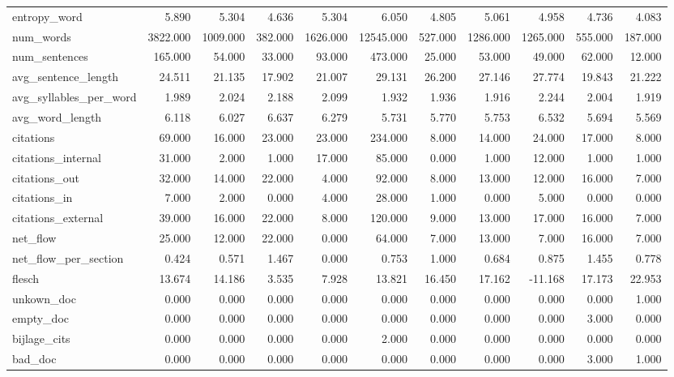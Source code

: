 \begin{tabular}{lrrrrrrrrrr}
\cline{1-11}
entropy\_word & 5.890 & 5.304 & 4.636 & 5.304 & 6.050 & 4.805 & 5.061 & 4.958 & 4.736 & 4.083 \\
\cline{1-11}
num\_words & 3822.000 & 1009.000 & 382.000 & 1626.000 & 12545.000 & 527.000 & 1286.000 & 1265.000 & 555.000 & 187.000 \\
\cline{1-11}
num\_sentences & 165.000 & 54.000 & 33.000 & 93.000 & 473.000 & 25.000 & 53.000 & 49.000 & 62.000 & 12.000 \\
\cline{1-11}
avg\_sentence\_length & 24.511 & 21.135 & 17.902 & 21.007 & 29.131 & 26.200 & 27.146 & 27.774 & 19.843 & 21.222 \\
\cline{1-11}
avg\_syllables\_per\_word & 1.989 & 2.024 & 2.188 & 2.099 & 1.932 & 1.936 & 1.916 & 2.244 & 2.004 & 1.919 \\
\cline{1-11}
avg\_word\_length & 6.118 & 6.027 & 6.637 & 6.279 & 5.731 & 5.770 & 5.753 & 6.532 & 5.694 & 5.569 \\
\cline{1-11}
citations & 69.000 & 16.000 & 23.000 & 23.000 & 234.000 & 8.000 & 14.000 & 24.000 & 17.000 & 8.000 \\
\cline{1-11}
citations\_internal & 31.000 & 2.000 & 1.000 & 17.000 & 85.000 & 0.000 & 1.000 & 12.000 & 1.000 & 1.000 \\
\cline{1-11}
citations\_out & 32.000 & 14.000 & 22.000 & 4.000 & 92.000 & 8.000 & 13.000 & 12.000 & 16.000 & 7.000 \\
\cline{1-11}
citations\_in & 7.000 & 2.000 & 0.000 & 4.000 & 28.000 & 1.000 & 0.000 & 5.000 & 0.000 & 0.000 \\
\cline{1-11}
citations\_external & 39.000 & 16.000 & 22.000 & 8.000 & 120.000 & 9.000 & 13.000 & 17.000 & 16.000 & 7.000 \\
\cline{1-11}
net\_flow & 25.000 & 12.000 & 22.000 & 0.000 & 64.000 & 7.000 & 13.000 & 7.000 & 16.000 & 7.000 \\
\cline{1-11}
net\_flow\_per\_section & 0.424 & 0.571 & 1.467 & 0.000 & 0.753 & 1.000 & 0.684 & 0.875 & 1.455 & 0.778 \\
\cline{1-11}
flesch & 13.674 & 14.186 & 3.535 & 7.928 & 13.821 & 16.450 & 17.162 & -11.168 & 17.173 & 22.953 \\
\cline{1-11}
unkown\_doc & 0.000 & 0.000 & 0.000 & 0.000 & 0.000 & 0.000 & 0.000 & 0.000 & 0.000 & 1.000 \\
\cline{1-11}
empty\_doc & 0.000 & 0.000 & 0.000 & 0.000 & 0.000 & 0.000 & 0.000 & 0.000 & 3.000 & 0.000 \\
\cline{1-11}
bijlage\_cits & 0.000 & 0.000 & 0.000 & 0.000 & 2.000 & 0.000 & 0.000 & 0.000 & 0.000 & 0.000 \\
\cline{1-11}
bad\_doc & 0.000 & 0.000 & 0.000 & 0.000 & 0.000 & 0.000 & 0.000 & 0.000 & 3.000 & 1.000 \\
\cline{1-11}
\bottomrule
\end{tabular}
